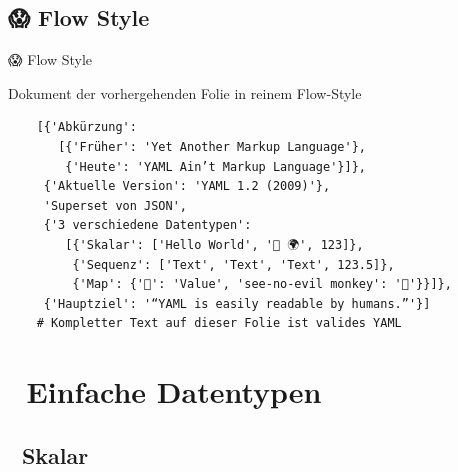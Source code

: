 \documentclass{beamer}
\begin{document}
\subsection{😱 Flow Style}

\begin{frame}[fragile]{😱 Flow Style}
  \begin{block}{Dokument der vorhergehenden Folie in reinem Flow-Style}
    \begin{verbatim}
    [{'Abkürzung':
       [{'Früher': 'Yet Another Markup Language'},
        {'Heute': 'YAML Ain’t Markup Language'}]},
     {'Aktuelle Version': 'YAML 1.2 (2009)'},
     'Superset von JSON',
     {'3 verschiedene Datentypen':
        [{'Skalar': ['Hello World', '👋 🌍', 123]},
         {'Sequenz': ['Text', 'Text', 'Text', 123.5]},
         {'Map': {'🔑': 'Value', 'see-no-evil monkey': '🙈'}}]},
     {'Hauptziel': '“YAML is easily readable by humans.”'}]
    # Kompletter Text auf dieser Folie ist valides YAML
    \end{verbatim}
  \end{block}
\end{frame}

\section{🐣 Einfache Datentypen}

\subsection{📏  Skalar}
\end{document}
